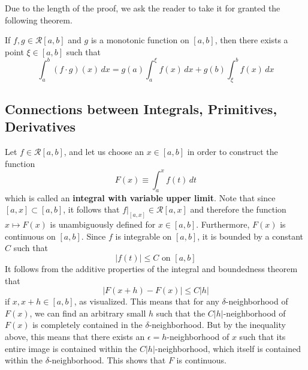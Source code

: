     Due to the length of the proof, we ask the reader to take it for granted the following theorem. 

    \begin{theorem}
    If $f, g \in \mathcal{R}[a, b]$ and $g$ is a monotonic function on $[a, b]$, then there exists a point $\xi \in [a, b]$ such that
    \[\int_a^b (f \cdot g) (x)\,dx = g(a) \int_a^\xi f(x)\,dx + g(b) \int_\xi^b f(x)\,dx\]
    \end{theorem}

  \subsection{Connections between Integrals, Primitives, Derivatives}

    \begin{definition}
      Let $f \in \mathcal{R}[a, b]$, and let us choose an $x \in [a, b]$ in order to construct the function
      \[F(x) \equiv \int_a^x f(t)\,dt\]
      which is called an \textbf{integral with variable upper limit}. Note that since $[a, x] \subset [a, b]$, it follows that $f \big|_{[a,x]} \in \mathcal{R}[a, x]$ and therefore the function $x \mapsto F(x)$ is unambiguously defined for $x \in [a, b]$. Furthermore, $F(x)$ is continuous on $[a, b]$. Since $f$ is integrable on $[a, b]$, it is bounded by a constant $C$ such that
      \[|f(t)| \leq C \text{ on } [a, b]\]
      It follows from the additive properties of the integral and boundedness theorem that 
      \[|F(x + h) - F(x)| \leq C|h|\]
      if $x, x + h \in [a, b]$, as visualized. This means that for any $\delta$-neighborhood of $F(x)$, we can find an arbitrary small $h$ such that the $C|h|$-neighborhood of $F(x)$ is completely contained in the $\delta$-neighborhood. But by the inequality above, this means that there exists an $\epsilon = h$-neighborhood of $x$ such that its entire image is contained within the $C|h|$-neighborhood, which itself is contained within the $\delta$-neighborhood. This shows that $F$ is continuous. 
    \end{definition}


